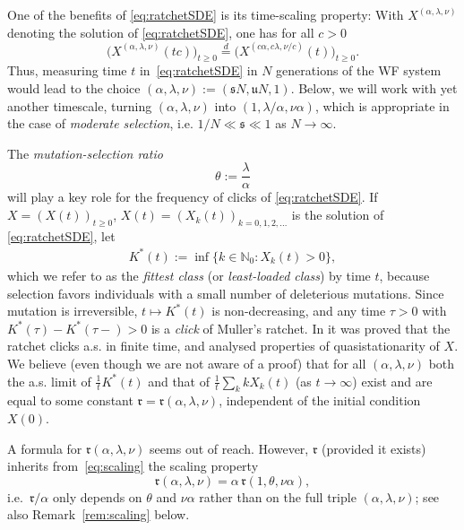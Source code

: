 \documentclass{imsart}
\theoremstyle{plain}
\theoremstyle{definition}
\begin{document}
One of the benefits of \eqref{eq:ratchetSDE} is its time-scaling property: With $X^{(\alpha, \lambda, \nu)}$ denoting the solution of \eqref{eq:ratchetSDE}, one has for all $c>0$
\begin{equation}\label{eq:scaling}
    \big(X^{(\alpha, \lambda, \nu)}(tc)\big)_{t\ge 0}  \stackrel d= 
     \big(X^{(c\alpha, c\lambda, \nu /c)}(t)\big)_{t\ge 0}.
\end{equation}
Thus, measuring time $t$ in~\eqref{eq:ratchetSDE} in $N$ generations of the WF system would lead to the choice $(\alpha, \lambda, \nu) := (\mathfrak s N, \mathfrak u N, 1)$. Below, we will work with yet another timescale, turning $(\alpha, \lambda, \nu)$ into $(1, \lambda/\alpha, \nu \alpha)$,  which is appropriate in the case of {\em moderate selection}, i.e. $1/N \ll \mathfrak s \ll 1$ as $N\to \infty$.

 The {\em mutation-selection ratio} 
$$\theta:= \frac \lambda \alpha$$
will play a key role  for the  frequency of clicks of \eqref{eq:ratchetSDE}.  If $X = (X(t))_{t\geq 0}$, $X(t) = (X_k(t))_{k=0,1,2,...}$ is the solution of \eqref{eq:ratchetSDE}, let
\begin{align}\label{eq:Kast}
  K^\ast(t) := \inf\{k\in\mathbb N_0: X_k(t)>0\},
\end{align}
which we refer to as the \emph{fittest class} (or \emph{least-loaded class}) by time $t$, because selection favors individuals with a small number of deleterious mutations. Since mutation is irreversible, $t\mapsto K^\ast(t)$ is non-decreasing, and any time $\tau>0$ with $K^\ast(\tau) - K^\ast(\tau-)>0$ is a \emph{click} of Muller's ratchet. In \cite{audiffren2013muller} it was proved  that the ratchet clicks a.s. in finite time, and \cite{mariani2025metastability} \mbox{analysed} properties of quasistationarity of $X$. We believe (even though we are not aware of a proof) that for all $(\alpha, \lambda, \nu)$  both the a.s. limit  of $\tfrac 1t K^\ast(t)$ and that of $\tfrac 1t \sum_k k X_k(t)$ (as $t\to \infty$) exist and are equal to some constant $\mathfrak r =  \mathfrak r (\alpha, \lambda, \nu)$, independent of the initial condition $X(0)$.

A formula for $\mathfrak r(\alpha, \lambda, \nu)$ seems out of reach. However, $\mathfrak r$ (provided it exists) inherits from~\eqref{eq:scaling} the scaling property 
$$\mathfrak r(\alpha, \lambda, \nu) = \alpha\,  \mathfrak r(1, \theta, \nu\alpha),$$
i.e.\ $\mathfrak r/\alpha $ only depends on $\theta$ and $\nu\alpha$ rather than on the full triple $(\alpha, \lambda, \nu)$; see also Remark~\ref{rem:scaling} below. 
\end{document}
